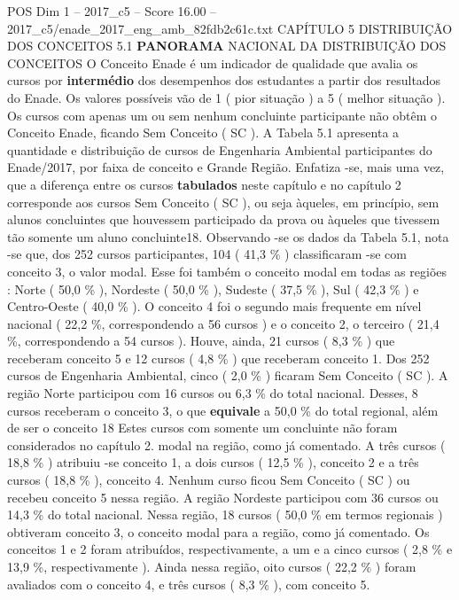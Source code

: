 \begin{textsample}{POS Dim 1 – 2017\_c5 – Score 16.00 – 2017\_c5/enade\_2017\_eng\_amb\_82fdb2c61c.txt}  \label{ex:f1_pos_054}
CAPÍTULO 5 DISTRIBUIÇÃO DOS CONCEITOS 5.1 \textbf{PANORAMA} NACIONAL DA DISTRIBUIÇÃO DOS CONCEITOS O Conceito Enade é um indicador de qualidade que avalia os cursos por \textbf{intermédio} dos desempenhos dos estudantes a partir dos resultados do Enade.
Os valores possíveis vão de 1 ( pior situação ) a 5 ( melhor situação ).
Os cursos com apenas um ou sem nenhum concluinte participante não obtêm o Conceito Enade, ficando Sem Conceito ( SC ).
A Tabela 5.1 apresenta a quantidade e distribuição de cursos de Engenharia Ambiental participantes do Enade/2017, por faixa de conceito e Grande Região.
Enfatiza -se, mais uma vez, que a diferença entre os cursos \textbf{tabulados} neste capítulo e no capítulo 2 corresponde aos cursos Sem Conceito ( SC ), ou seja àqueles, em princípio, sem alunos concluintes que houvessem participado da prova ou àqueles que tivessem tão somente um aluno concluinte18.
Observando -se os dados da Tabela 5.1, nota -se que, dos 252 cursos participantes, 104 ( 41,3 \% ) classificaram -se com conceito 3, o valor modal.
Esse foi também o conceito modal em todas as regiões : Norte ( 50,0 \% ), Nordeste ( 50,0 \% ), Sudeste ( 37,5 \% ), Sul ( 42,3 \% ) e Centro-Oeste ( 40,0 \% ).
O conceito 4 foi o segundo mais frequente em nível nacional ( 22,2 \%, correspondendo a 56 cursos ) e o conceito 2, o terceiro ( 21,4 \%, correspondendo a 54 cursos ).
Houve, ainda, 21 cursos ( 8,3 \% ) que receberam conceito 5 e 12 cursos ( 4,8 \% ) que receberam conceito 1.
Dos 252 cursos de Engenharia Ambiental, cinco ( 2,0 \% ) ficaram Sem Conceito ( SC ).
A região Norte participou com 16 cursos ou 6,3 \% do total nacional.
Desses, 8 cursos receberam o conceito 3, o que \textbf{equivale} a 50,0 \% do total regional, além de ser o conceito 18 Estes cursos com somente um concluinte não foram considerados no capítulo 2. modal na região, como já comentado.
A três cursos ( 18,8 \% ) atribuiu -se conceito 1, a dois cursos ( 12,5 \% ), conceito 2 e a três cursos ( 18,8 \% ), conceito 4.
Nenhum curso ficou Sem Conceito ( SC ) ou recebeu conceito 5 nessa região.
A região Nordeste participou com 36 cursos ou 14,3 \% do total nacional.
Nessa região, 18 cursos ( 50,0 \% em termos regionais ) obtiveram conceito 3, o conceito modal para a região, como já comentado.
Os conceitos 1 e 2 foram atribuídos, respectivamente, a um e a cinco cursos ( 2,8 \% e 13,9 \%, respectivamente ).
Ainda nessa região, oito cursos ( 22,2 \% ) foram avaliados com o conceito 4, e três cursos ( 8,3 \% ), com conceito 5.

\end{textsample}
